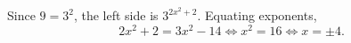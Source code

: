 Since $9=3^2$, the left side is $3^{2x^2+2}$. Equating exponents,
\[2x^2+2=3x^2-14\iff x^2=16\iff x=\boxed{\pm4}.\]
